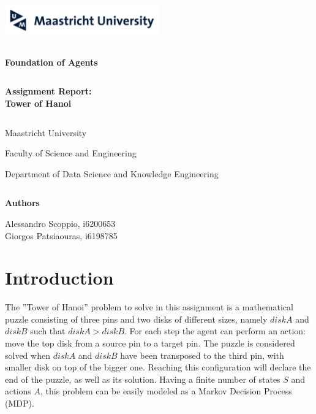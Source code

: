 \documentclass[11pt]{article}
\numberwithin{equation}{section}
\numberwithin{table}{section}
\numberwithin{figure}{secation}
\begin{document}
	
	\newpage
	\thispagestyle{empty}
	
	{\includegraphics[width=0.5\textwidth,keepaspectratio]{um.png}\\
		
		\begin{verbatim}
		\end{verbatim}
		
		\begin{center}
			
			\huge{\textbf{Foundation of Agents}}
			
		\end{center}
		
		\begin{verbatim}
		\end{verbatim}
		
		\begin{center}
			\Large{\textbf{Assignment Report:\\ Tower of Hanoi}}
			\begin{verbatim}
			\end{verbatim}
			\Large{Maastricht University}
			\par
			\Large{Faculty of Science and Engineering}
			\par
			\Large{Department of Data Science and Knowledge Engineering}
			\begin{verbatim}
			\end{verbatim}
			\Large{\textbf{Authors}}\par
			\Large{Alessandro Scoppio, i6200653\\
				Giorgos Patsiaouras, i6198785}
			\par    	
		\end{center}
		\newpage
    \setcounter{page}{1}
		\section{Introduction}
		
		The ''Tower of Hanoi'' problem to solve in this assignment is a mathematical puzzle consisting of three pins and two disks of different sizes, namely  $disk A$ and $disk B$ such that $disk A > disk B$.
		For each step the agent can perform an action: move the top disk from a source pin to a target pin. 
		The puzzle is considered solved when $disk A$ and $disk B$ have been transposed to the third pin, with smaller disk on top of the bigger one. Reaching this configuration will declare the end of the puzzle, as well as its solution. Having a finite number of states $S$ and actions $A$, this problem can be easily modeled as a Markov Decision Process (MDP).
		

}
\end{document}
